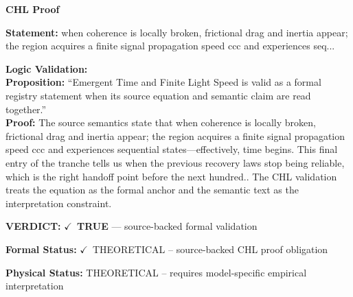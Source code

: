 \vspace{0.45em}
\noindent\textbf{CHL Proof}\par
\textbf{Statement:} when coherence is locally broken, frictional drag and inertia appear; the region
acquires a finite signal propagation speed ccc and experiences seq...

\textbf{Logic Validation:}\\
\textbf{Proposition:} ``Emergent Time and Finite Light Speed is valid as a formal registry statement when its
source equation and semantic claim are read together.''\\
\textbf{Proof:} The source semantics state that when coherence is locally broken, frictional drag and
inertia appear; the region acquires a finite signal propagation speed ccc and
experiences sequential states---effectively, time begins. This final entry of the
tranche tells us when the previous recovery laws stop being reliable, which is the right
handoff point before the next hundred.. The CHL validation treats the equation as the
formal anchor and the semantic text as the interpretation constraint.

\textbf{VERDICT:} \ensuremath{\checkmark}\ \textbf{TRUE} --- source-backed formal validation

\textbf{Formal Status:} \ensuremath{\checkmark}\ THEORETICAL -- source-backed CHL proof obligation

\textbf{Physical Status:} THEORETICAL -- requires model-specific empirical interpretation
\par\vspace{0.45em}
\par
\ifTZPDarkEdition
{}
\fi
\endgroup
\endgroup
